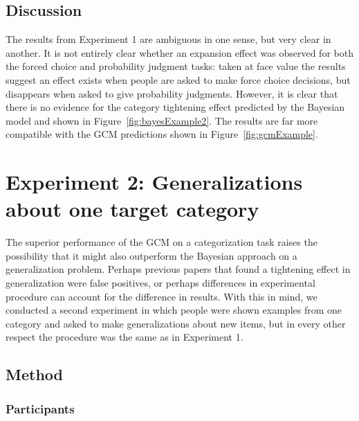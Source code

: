 \documentclass[doc,apacite]{apa6}
\begin{document}
\subsection{Discussion}

The results from Experiment 1 are ambiguous in one sense, but very clear in another. It is not entirely clear whether an expansion effect was observed for both the {\sc forced choice} and {\sc probability} judgment tasks: taken at face value the results suggest an effect exists when people are asked to make force choice decisions, but disappears when asked to give probability judgments.
However, it is clear that there is no evidence for the category tightening effect predicted by the Bayesian model and shown in Figure~\ref{fig:bayesExample2}. The results are far more compatible with the GCM predictions shown in Figure~\ref{fig:gcmExample}.



\section{Experiment 2: Generalizations about one target category}

The superior performance of the GCM on a categorization task raises the possibility that it might also outperform the Bayesian approach on a generalization problem. Perhaps previous papers that found a tightening effect in generalization were false positives, or perhaps differences in experimental procedure can account for the difference in results. With this in mind, we conducted a second experiment in which people were shown examples from one category and asked to make generalizations about new items, but in every other respect the procedure was the same as in Experiment 1.

\subsection{Method}

\subsubsection{Participants}
\end{document}
